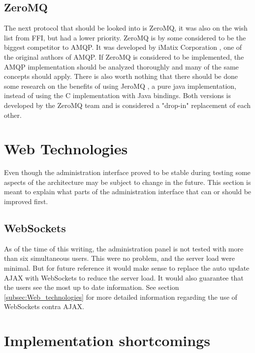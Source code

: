 \subsection{ZeroMQ}
The next protocol that should be looked into is ZeroMQ, it was also on the wish list from FFI, but had a lower priority. ZeroMQ is by some considered to be the biggest competitor to AMQP. It was developed by iMatix Corporation \cite{imatix}, one of the original authors of AMQP. If ZeroMQ is considered to be implemented, the AMQP implementation should be analyzed thoroughly and many of the same concepts should apply. There is also worth nothing that there should be done some research on the benefits of using JeroMQ \cite{jero-mq}, a pure java implementation, instead of using the C implementation with Java bindings. Both versions is developed by the ZeroMQ team and is considered a "drop-in" replacement of each other.

\section{Web Technologies}
Even though the administration interface proved to be stable during testing some aspects of the architecture may be subject to change in the future. This section is meant to explain what parts of the administration interface that can or should be improved first. 

\subsection{WebSockets}
As of the time of this writing, the administration panel is not tested with more than six simultaneous users. This were no problem, and the server load were minimal. But for future reference it would make sense to replace the auto update AJAX with WebSockets to reduce the server load. It would also guarantee that the users see the most up to date information. See section \ref{subsec:Web_technologies} for more detailed information regarding the use of WebSockets contra AJAX.

\section{Implementation shortcomings}
